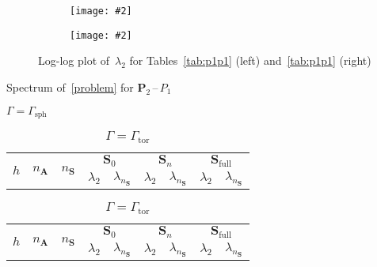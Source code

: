 \documentclass[12pt]{article}
\newcommand{\includegraphicsw}[2][1.]{\texttt{[image: \#2]}}
\newcommand{\vect}[1]{\boldsymbol{\mathbf{#1}}}
\newcommand{\sphere}{{\Gamma_{\text{sph}}}}
\newcommand{\tor}{{\Gamma_{\text{tor}}}}
\begin{document}
\vfill
\begin{figure}[h]
	\centering\small
	\begin{subfigure}{.49\linewidth}
		\centering
		\includegraphicsw{sphere_2_P1P1.png}
	\end{subfigure}%
	\hfill
	\begin{subfigure}{.49\linewidth}
		\centering
		\includegraphicsw{torus_P1P1.png}
	\end{subfigure}
	\caption{Log-log plot of~$\lambda_2$ for Tables~\ref{tab:p1p1} (left) and~\ref{tab:p1p1} (right)}
\end{figure}
\vfill

\clearpage

\begin{table}[h]
	\centering\small
	\caption{Spectrum of~\eqref{problem} for $\vect P_2$\,--\,$P_1$} 
	\label{tab:p2p1}
	\begin{subtable}{1.\linewidth}
		\centering
		\caption{$\Gamma = \sphere$}
		\label{tab:p2p1:sph}
		\begin{tabular}[1.3]{|c|c|c|c|c|c|c|c|c|}
			\hline
			\multirow{2}{*}{$h$} & \multirow{2}{*}{$n_{\vect A}$} & \multirow{2}{*}{$n_{\vect S}$} & \multicolumn{2}{c|}{$\vect S_0$} & \multicolumn{2}{c|}{$\vect S_n$} & \multicolumn{2}{c|}{$\vect S_{\text{full}}$} \\ 
			\cline{4-9}
			& & & $\lambda_2$ & $\lambda_{n_{\vect S}}$ & $\lambda_2$ & $\lambda_{n_{\vect S}}$ & $\lambda_2$ & $\lambda_{n_{\vect S}}$ \\ 
			\hline
			
		\end{tabular}
	\end{subtable}%
	\vskip 3mm
	\begin{subtable}{1.\linewidth}
		\centering
		\caption{$\Gamma = \tor$}
		\label{tab:p2p1:tor}
		\begin{tabular}[1.3]{|c|c|c|c|c|c|c|c|c|}
			\hline
			\multirow{2}{*}{$h$} & \multirow{2}{*}{$n_{\vect A}$} & \multirow{2}{*}{$n_{\vect S}$} & \multicolumn{2}{c|}{$\vect S_0$} & \multicolumn{2}{c|}{$\vect S_n$} & \multicolumn{2}{c|}{$\vect S_{\text{full}}$} \\ 
			\cline{4-9}
			& & & $\lambda_2$ & $\lambda_{n_{\vect S}}$ & $\lambda_2$ & $\lambda_{n_{\vect S}}$ & $\lambda_2$ & $\lambda_{n_{\vect S}}$ \\ 
			\hline
			
		\end{tabular}
	\end{subtable}
\end{table}
\end{document}
